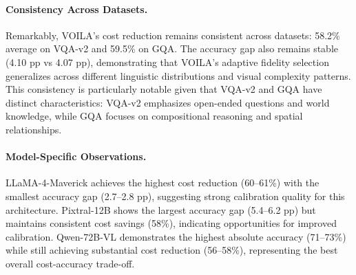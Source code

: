 \begin{table}[t]
\centering
\caption{\textbf{Cost Savings and Accuracy Preservation.} VOILA achieves substantial cost reductions with minimal accuracy loss across VQA-v2 and GQA datasets. All costs are normalized to full-resolution baseline (120). ``$\Delta$ Acc'' indicates accuracy gap in percentage points relative to full-resolution processing.}
\label{tab:cost_savings_combined}
\end{table}

\paragraph{Consistency Across Datasets.} Remarkably, VOILA's cost reduction remains consistent across datasets: 58.2\% average on VQA-v2 and 59.5\% on GQA. The accuracy gap also remains stable (4.10 pp vs 4.07 pp), demonstrating that VOILA's adaptive fidelity selection generalizes across different linguistic distributions and visual complexity patterns. This consistency is particularly notable given that VQA-v2 and GQA have distinct characteristics: VQA-v2 emphasizes open-ended questions and world knowledge, while GQA focuses on compositional reasoning and spatial relationships.

\paragraph{Model-Specific Observations.} LLaMA-4-Maverick achieves the highest cost reduction (60--61\%) with the smallest accuracy gap (2.7--2.8 pp), suggesting strong calibration quality for this architecture. Pixtral-12B shows the largest accuracy gap (5.4--6.2 pp) but maintains consistent cost savings (58\%), indicating opportunities for improved calibration. Qwen-72B-VL demonstrates the highest absolute accuracy (71--73\%) while still achieving substantial cost reduction (56--58\%), representing the best overall cost-accuracy trade-off.

